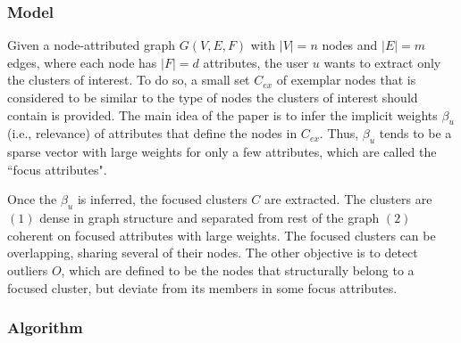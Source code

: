 \documentclass[11pt, oneside]{article}   	%
\begin{document}
\subsubsection*{Model}

\quad Given a node-attributed graph $G(V,E,F)$ with $|V|=n$ nodes and $|E|=m$ edges, where each node has $|F| = d$ attributes, the user $u$ wants to extract only the clusters of interest.
To do so, a small set $C_{ex}$ of exemplar nodes that is considered to be similar to the type of nodes the clusters of interest should contain is provided.
The main idea of the paper is to infer the implicit weights $\beta_{u}$ (i.e., relevance) of attributes that define the nodes in $C_{ex}$.
Thus, $\beta_u$ tends to be a sparse vector with large weights for only a few attributes, which are called the ``focus attributes".

\quad Once the $\beta_u$ is inferred, the focused clusters $C$ are extracted. 
The clusters are $(1)$ dense in graph structure and separated from rest of the graph $(2)$ coherent on focused attributes with large weights.
The focused clusters can be overlapping, sharing several of their nodes.
The other objective is to detect outliers $O$, which are defined to be the nodes that structurally belong to a focused cluster, but deviate from its members in some focus attributes.

\subsubsection*{Algorithm}
\end{document}
